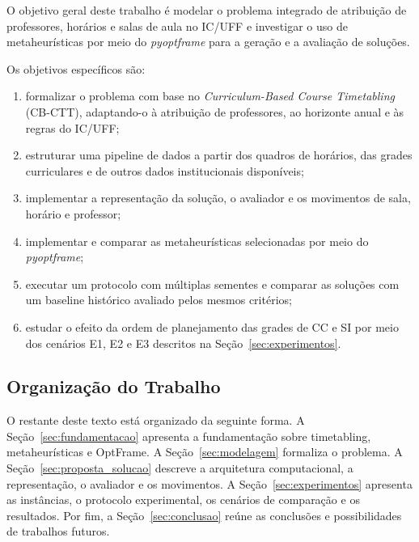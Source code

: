 O objetivo geral deste trabalho é modelar o problema integrado de atribuição de professores, horários e salas de aula no IC/UFF e investigar o uso de metaheurísticas por meio do \textit{pyoptframe} para a geração e a avaliação de soluções.

Os objetivos específicos são:
\begin{enumerate}
    \item formalizar o problema com base no \textit{Curriculum-Based Course Timetabling} (CB-CTT), adaptando-o à atribuição de professores, ao horizonte anual e às regras do IC/UFF;
    \item estruturar uma pipeline de dados a partir dos quadros de horários, das grades curriculares e de outros dados institucionais disponíveis;
    \item implementar a representação da solução, o avaliador e os movimentos de sala, horário e professor;
    \item implementar e comparar as metaheurísticas selecionadas por meio do \textit{pyoptframe};
    \item executar um protocolo com múltiplas sementes e comparar as soluções com um baseline histórico avaliado pelos mesmos critérios;
    \item estudar o efeito da ordem de planejamento das grades de CC e SI por meio dos cenários E1, E2 e E3 descritos na Seção~\ref{sec:experimentos}.
\end{enumerate}

\subsection{Organização do Trabalho}
\label{subsec:organizacao}

O restante deste texto está organizado da seguinte forma. A Seção~\ref{sec:fundamentacao} apresenta a fundamentação sobre timetabling, metaheurísticas e OptFrame. A Seção~\ref{sec:modelagem} formaliza o problema. A Seção~\ref{sec:proposta_solucao} descreve a arquitetura computacional, a representação, o avaliador e os movimentos. A Seção~\ref{sec:experimentos} apresenta as instâncias, o protocolo experimental, os cenários de comparação e os resultados. Por fim, a Seção~\ref{sec:conclusao} reúne as conclusões e possibilidades de trabalhos futuros.
